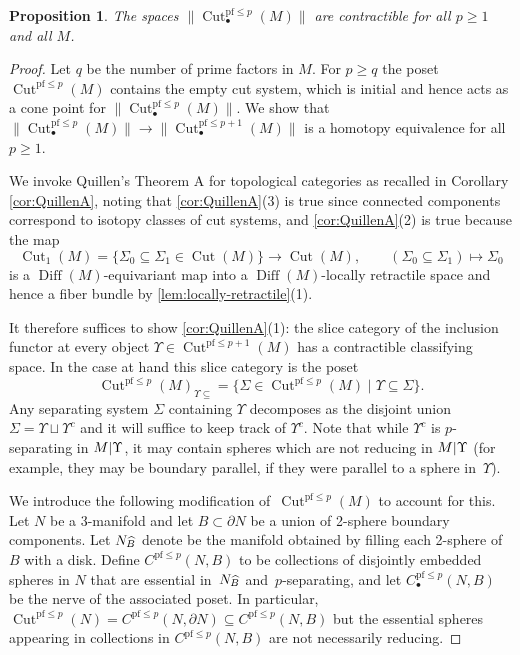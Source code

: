 \documentclass{amsart}
\theoremstyle{plain}
\newtheorem{prop}[thm]{Proposition}
\theoremstyle{definition}
\DeclareMathOperator\Diff{Diff}
\newcommand{\scl}[1]{\smash{\widehat{#1}}} %
\DeclareMathOperator\cut{Cut} %
\newcommand{\qsep}[1]{\cut^{\mathrm{pf}\leq{#1}}} %
\newcommand{\ca}{\smash{\mid}} %
\begin{document}
\begin{prop}\label{prop:sep-p-contractible}
    The spaces $\|\qsep{p}_\bullet(M)\|$ are contractible for all $p \ge 1$ and all $M$.
\end{prop}
\begin{proof} 
    Let $q$ be the number of prime factors in $M$. 
    For $p \ge q$ the poset $\qsep{p}(M)$ contains the empty cut system, which is initial and hence acts as a cone point for $\|\qsep{p}_\bullet(M)\|$.
    We show that $\|\qsep{p}_\bullet(M)\| \to \|\qsep{p+1}_\bullet(M)\|$ is a homotopy equivalence for all $p\ge 1$.
    
    We invoke Quillen's Theorem A for topological categories \cite[Theorem 4.8]{EbertRandalWilliams} as recalled in Corollary \ref{cor:QuillenA},  noting that \ref{cor:QuillenA}(3) is true since connected components correspond to isotopy classes of cut systems, and \ref{cor:QuillenA}(2) is true
    because the map
    \[
        \cut_1(M) = \{\Sigma_0 \subseteq \Sigma_1 \in \cut(M)\} \to \cut(M),
        \qquad
        (\Sigma_0 \subseteq \Sigma_1) \mapsto \Sigma_0
    \]
    is a $\Diff(M)$-equivariant map into a $\Diff(M)$-locally retractile space and hence a fiber bundle by \cref{lem:locally-retractile}(1).
    
    It therefore suffices to show \ref{cor:QuillenA}(1): the slice category of the inclusion functor at every object $\Upsilon \in \qsep{p+1}(M)$ has a contractible classifying space.
    In the case at hand this slice category is the poset
    \[
        \qsep{p}(M)_{\Upsilon \subseteq} = \{ \Sigma \in \qsep{p}(M) \;|\; \Upsilon \subseteq \Sigma\}.
    \]
    Any separating system $\Sigma$ containing $\Upsilon$ decomposes as the disjoint union $\Sigma = \Upsilon \sqcup \Upsilon^c$ and it will suffice to keep track of $\Upsilon^c$.
    Note that while $\Upsilon^c$ is $p$-separating in $M\ca \Upsilon$, it may contain spheres which are not reducing in $M \ca \Upsilon$ (for example, they may be boundary parallel, if they were parallel to a sphere in~$\Upsilon$).  
    
    We introduce the following modification of~$\qsep{p}(M)$ to account for this.  Let $N$ be a 3-manifold and let $B\subset \partial N$ be a union of 2-sphere boundary components.  Let $N_{\scl{B}}$ denote be the manifold obtained by filling each 2-sphere of $B$ with a disk. Define $C^{\mathrm{pf}\leq p}(N,B)$ to be collections of disjointly embedded spheres in $N$ that are essential in~$N_{\scl{B}}$ and~$p$-separating, and let $C_\bullet^{\mathrm{pf}\leq p}(N,B)$ be the nerve of the associated poset. 
    In particular, $\qsep{p}(N) = C^{\mathrm{pf} \le p}(N, \partial N) \subseteq C^{\mathrm{pf}\leq p}(N,B)$ but the essential spheres appearing in collections in $C^{\mathrm{pf}\leq p}(N, B)$ are not necessarily reducing.
    

\end{proof}
\end{document}
